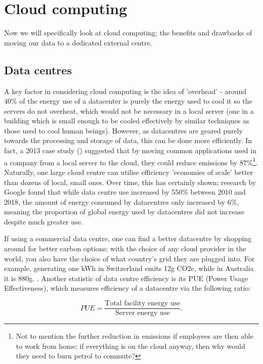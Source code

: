 \documentclass{article}
\begin{document}
\section{Cloud computing}
Now we will specifically look at cloud computing; the benefits and drawbacks of moving our data to a dedicated external centre.


\subsection{Data centres}
A key factor in considering cloud computing is the idea of 'overhead' - around 40\% of the energy use of a datacenter is purely the energy used to cool it so the servers do not overheat,  \citep{lannelongue2021ten} which would not be necessary in a local server (one in a building which is small enough to be cooled effectively by similar techniques as those used to cool human beings). However, as datacentres are geared purely towards the processing and storage of data, this can be done more efficiently. In fact, a 2013 case study (\citet{masanet2013energy}) suggested that by moving common applications used in a company from a local server to the cloud, they could reduce emissions by 87\%\footnote{Not to mention the further reduction in emissions if employees are then able to work from home; if everything is on the cloud anyway, then why would they need to burn petrol to commute?}. Naturally, one large cloud centre can utilise efficiency 'economies of scale' better than dozens of local, small ones. Over time, this has certainly shown; research by Google found that while data centre use increased by 550\% between 2010 and 2018, the amount of energy consumed by datacentres only increased by 6\%, meaning the proportion of global energy used by datacentres did not increase despite much greater use. \citep{masanet2020recalibrating}\newline

If using a commercial data centre, one can find a better datacentre by shopping around for better carbon options; with the choice of any cloud provider in the world, you also have the choice of what country's grid they are plugged into. For example, generating one kWh in Switzerland emits 12g CO2e, while in Australia it is 880g. \citep{grealey2021carbon}. Another statistic of data centre efficiency is its PUE (Power Usage Effectiveness), which measures efficiency of a datacentre via the following ratio:

$$PUE = \frac{\textrm{Total facility energy use}}{\textrm{Server energy use}}.$$
\end{document}
